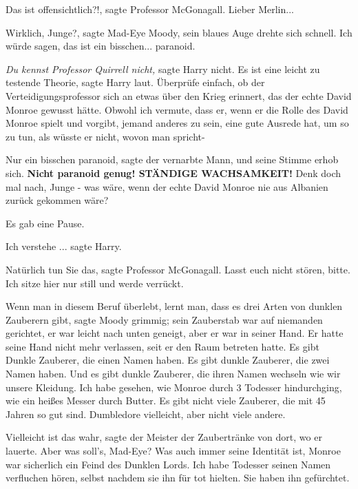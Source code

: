 \glqq Das ist offensichtlich?!\grqq{}, sagte Professor McGonagall. \glqq Lieber
Merlin...\grqq{}

\glqq Wirklich, Junge?\grqq{}, sagte Mad-Eye Moody, sein blaues Auge drehte sich
schnell. \glqq Ich würde sagen, das ist ein bisschen... paranoid.\grqq{}

\emph{Du kennst Professor Quirrell nicht, }sagte Harry nicht. \glqq Es ist eine
leicht zu testende Theorie\grqq{}, sagte Harry laut. \glqq Überprüfe einfach, ob
der Verteidigungsprofessor sich an etwas über den Krieg erinnert, das der echte
David Monroe gewusst hätte. Obwohl ich vermute, dass er, wenn er die Rolle des
David Monroe spielt und vorgibt, jemand anderes zu sein, eine gute Ausrede hat,
um so zu tun, als wüsste er nicht, wovon man spricht-\grqq{}

\glqq Nur ein bisschen paranoid\grqq{}, sagte der vernarbte Mann, und seine
Stimme erhob sich. \glqq \textbf{Nicht paranoid genug! STÄNDIGE WACHSAMKEIT!}
Denk doch mal nach, Junge - was wäre, wenn der echte David Monroe nie aus
Albanien zurück gekommen wäre?\grqq{}

Es gab eine Pause.

\glqq Ich verstehe ...\grqq{} sagte Harry.

\glqq Natürlich tun Sie das\grqq{}, sagte Professor McGonagall. \glqq Lasst euch
nicht stören, bitte. Ich sitze hier nur still und werde verrückt.\grqq{}

\glqq Wenn man in diesem Beruf überlebt, lernt man, dass es drei Arten von
dunklen Zauberern gibt\grqq{}, sagte Moody grimmig; sein Zauberstab war auf
niemanden gerichtet, er war leicht nach unten geneigt, aber er war in seiner
Hand. Er hatte seine Hand nicht mehr verlassen, seit er den Raum betreten hatte.
\glqq Es gibt Dunkle Zauberer, die einen Namen haben. Es gibt dunkle Zauberer,
die zwei Namen haben. Und es gibt dunkle Zauberer, die ihren Namen wechseln wie
wir unsere Kleidung. Ich habe gesehen, wie \glqq Monroe\grqq{} durch 3 Todesser
hindurchging, wie ein heißes Messer durch Butter. Es gibt nicht viele Zauberer,
die mit 45 Jahren so gut sind. Dumbledore vielleicht, aber nicht viele
andere.\grqq{}

\glqq Vielleicht ist das wahr\grqq{}, sagte der Meister der Zaubertränke von
dort, wo er lauerte. \glqq Aber was soll's, Mad-Eye? Was auch immer seine
Identität ist, Monroe war sicherlich ein Feind des Dunklen Lords. Ich habe
Todesser seinen Namen verfluchen hören, selbst nachdem sie ihn für tot hielten.
Sie haben ihn gefürchtet.\grqq{}

